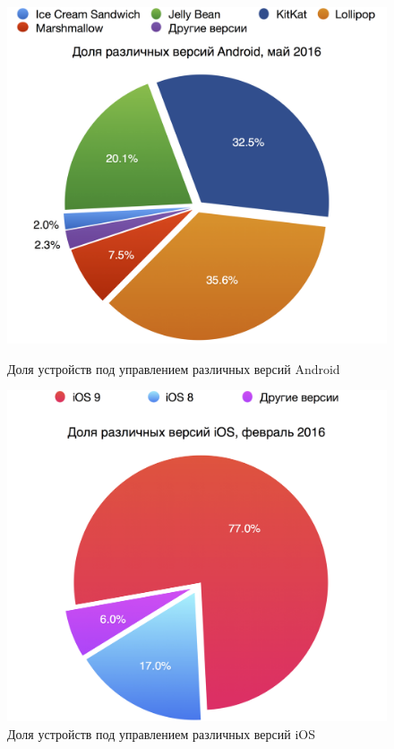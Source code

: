 \begin{figure}[h]
  \begin{center}
    \begin{minipage}[h]{0.47\linewidth}
      \includegraphics[width=1\linewidth]{fig/android_versions}
      \caption{Доля устройств под управлением различных версий Android}
      \label{fig:android_versions}
    \end{minipage}
    \hfill
    \begin{minipage}[h]{0.47\linewidth}
      \includegraphics[width=1\linewidth]{fig/ios_versions}
      \caption{Доля устройств под управлением различных версий iOS}
      \label{fig:ios_versions}
    \end{minipage}
  \end{center}
\end{figure}

